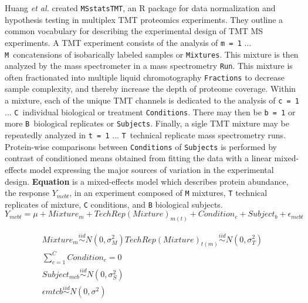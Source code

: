 \documentclass[11pt]{elife}\usepackage[]{graphicx}\usepackage[]{color}
\begin{document}
Huang \textit{et al.} created \texttt{MSstatsTMT}, an R package for data
normalization and hypothesis testing in multiplex TMT proteomics experiments. 
They outline a common vocabulary for describing the experimental design of 
TMT MS experiments. A TMT experiment consists
of the analysis of \texttt{m = 1} ... \texttt{M}\ concatensions of isobarically
labeled samples or \texttt{Mixtures}. This mixture is then analyzed by the mass
spectrometer in a mass spectrometry \texttt{Run}. This mixture is often
fractionated into multiple liquid chromotography \texttt{Fractions} to decrease
sample complexity, and thereby increase the depth of proteome coverage. 
Within a mixture, each of the unique TMT channels is dedicated to the 
analysis of \texttt{c = 1} ... \texttt{C}\ individual biological or treatment 
\texttt{Conditions}.  There may then be \texttt{b = 1} or more \texttt{B}\ 
biological replicates or \texttt{Subjects}. Finally, a sigle TMT mixture may be 
repeatedly analyzed in \texttt{t = 1} ... \texttt{T}\ technical replicate mass 
spectrometry runs.\\

Protein-wise comparisons between \texttt{Conditions} of \texttt{Subjects} is 
performed by contrast of conditioned means obtained from fitting the data with a
linear mixed-effects model expressing the major sources of variation in the
experimental design. \textbf{Equation} is a mixed-effects model which describes
protein abundance, the response $Y_{mcbt}$, in an experiment composed of
\texttt{M} mixtures, \texttt{T} technical replicates of mixture, \texttt{C}
conditions, and \texttt{B} biological subjects.\\

\begin{equation}
	Y_{mcbt} = \mu + Mixture_m + TechRep(Mixture)_{m(t)} + Condition_c + 
	Subject_b + \epsilon_{mcbt}
\end{equation}


\begin{equation}
  \begin{gathered}
	Mixture_m \stackrel{iid}{\sim} N(0,\sigma^2_M)
	TechRep(Mixture)_{t(m)} \stackrel{iid}{\sim} N(0,\sigma^2_T) \\
	\sum_{c=1}^{C} Condition_c = 0 \\
	Subject_{mcb} \stackrel{iid}{\sim} N(0,\sigma^2_S) \\
	\epsilon{mtcb} \stackrel{iid}{\sim} N(0,\sigma^2) \\
  \end{gathered}
\end{equation}
\end{document}
